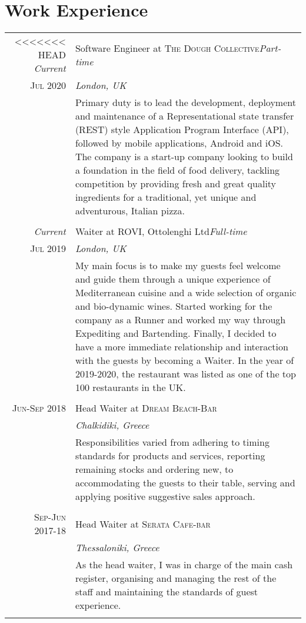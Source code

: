 \documentclass[a4paper,10pt]{article}
\begin{document}
{\section{Work Experience}
\begin{tabular}{r|p{11cm}}
<<<<<<< HEAD
\emph{Current} & Software Engineer at \textsc{The Dough Collective}\hfill\textit{Part-time} \\\textsc{Jul 2020} &\emph{London, UK} \\&\footnotesize{Primary duty is to lead the development, deployment and maintenance of a Representational state transfer (REST) style Application Program Interface (API), followed by mobile applications, Android and iOS. The company is a start-up company looking to build a foundation in the field of food delivery, tackling competition by providing fresh and great quality ingredients for a traditional, yet unique and adventurous, Italian pizza.} \\\multicolumn{2}{c}{} \\
\emph{Current} & Waiter at \textsc{ROVI}, Ottolenghi Ltd\hfill \textit{Full-time} \\\textsc{Jul 2019} &\emph{London, UK}\\&\footnotesize{My main focus is to make my guests feel welcome and guide them through a unique experience of Mediterranean cuisine and a wide selection of organic and bio-dynamic wines. Started working for the company as a Runner and worked my way through Expediting and Bartending. Finally, I decided to have a more immediate relationship and interaction with the guests by becoming a Waiter. In the year of 2019-2020, the restaurant was listed as one of the top 100 restaurants in the UK.}\\\multicolumn{2}{c}{} \\
\textsc{Jun-Sep 2018} & Head Waiter at \textsc{Dream Beach-Bar} \\&\emph{Chalkidiki, Greece}\\&\footnotesize{Responsibilities varied from adhering to timing standards for products and services, reporting remaining stocks and ordering new, to accommodating the guests to their table, serving and applying positive suggestive sales approach.}\\\multicolumn{2}{c}{} \\
\textsc{Sep-Jun 2017-18} & Head Waiter at \textsc{Serata Cafe-bar} \\&\emph{Thessaloniki, Greece}\\&\footnotesize{As the head waiter, I was in charge of the main cash register, organising and managing the rest of the staff and maintaining the standards of guest experience.}\\\multicolumn{2}{c}{} \\

\end{tabular}}
\end{document}
